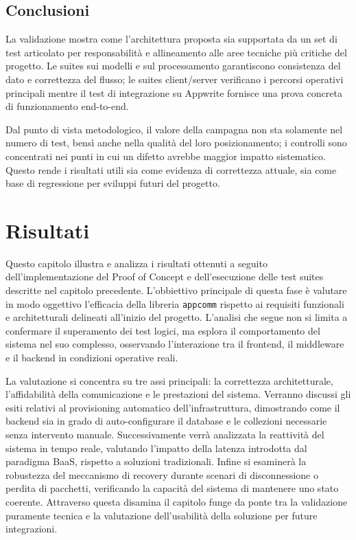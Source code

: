 \documentclass[a4paper, 11pt, twoside]{report}
\begin{document}
\section{Conclusioni}

La validazione mostra come l'architettura proposta sia supportata da un set di test articolato per responsabilità e allineamento alle
aree tecniche più critiche del progetto. Le suites sui modelli e sul processamento garantiscono consistenza del dato e correttezza del
flusso; le suites client/server verificano i percorsi operativi principali mentre il test di integrazione su Appwrite fornisce una prova
concreta di funzionamento end-to-end.

Dal punto di vista metodologico, il valore della campagna non sta solamente nel numero di test, bensì anche nella qualità del loro
posizionamento; i controlli sono concentrati nei punti in cui un difetto avrebbe maggior impatto sistematico.
Questo rende i risultati utili sia come evidenza di correttezza attuale, sia come base di regressione per sviluppi futuri del progetto.

\chapter{Risultati}

Questo capitolo illustra e analizza i risultati ottenuti a seguito dell'implementazione del Proof of Concept e dell'esecuzione delle
test suites descritte nel capitolo precedente. L'obbiettivo principale di questa fase è valutare in modo oggettivo l'efficacia della
libreria \texttt{appcomm} rispetto ai requisiti funzionali e architetturali delineati all'inizio del progetto. L'analisi che segue
non si limita a confermare il superamento dei test logici, ma esplora il comportamento del sistema nel suo complesso, osservando
l'interazione tra il frontend, il middleware e il backend in condizioni operative reali.

La valutazione si concentra su tre assi principali: la correttezza architetturale, l'affidabilità della comunicazione e le
prestazioni del sistema. Verranno discussi gli esiti relativi al provisioning automatico dell'infrastruttura, dimostrando come il
backend sia in grado di auto-configurare il database e le collezioni necessarie senza intervento manuale. Successivamente verrà
analizzata la reattività del sistema in tempo reale, valutando l'impatto della latenza introdotta dal paradigma BaaS, rispetto a
soluzioni tradizionali. Infine si esaminerà la robustezza del meccanismo di recovery durante scenari di disconnessione o perdita
di pacchetti, verificando la capacità del sistema di mantenere uno stato coerente. Attraverso questa disamina il capitolo funge
da ponte tra la validazione puramente tecnica e la valutazione dell'usabilità della soluzione per future integrazioni.
\end{document}
